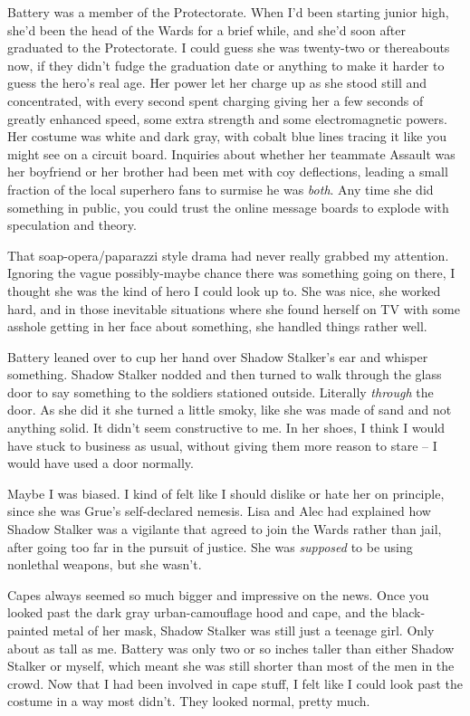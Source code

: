 Battery was a member of the Protectorate.  When I'd been starting junior high, she'd been the head of the Wards for a brief while, and she'd soon after graduated to the Protectorate.  I could guess she was twenty-two or thereabouts now, if they didn't fudge the graduation date or anything to make it harder to guess the hero's real age.  Her power let her charge up as she stood still and concentrated, with every second spent charging giving her a few seconds of greatly enhanced speed, some extra strength and some electromagnetic powers.  Her costume was white and dark gray, with cobalt blue lines tracing it like you might see on a circuit board.  Inquiries about whether her teammate Assault was her boyfriend or her brother had been met with coy deflections, leading a small fraction of the local superhero fans to surmise he was \emph{both}.  Any time she did something in public, you could trust the online message boards to explode with speculation and theory.



That soap-opera/paparazzi style drama had never really grabbed my attention.  Ignoring the vague possibly-maybe chance there was something going on there, I thought she was the kind of hero I could look up to.  She was nice, she worked hard, and in those inevitable situations where she found herself on TV with some asshole getting in her face about something, she handled things rather well.



Battery leaned over to cup her hand over Shadow Stalker's ear and whisper something.  Shadow Stalker nodded and then turned to walk through the glass door to say something to the soldiers stationed outside.  Literally \emph{through} the door.  As she did it she turned a little smoky, like she was made of sand and not anything solid.  It didn't seem constructive to me.  In her shoes, I think I would have stuck to business as usual, without giving them more reason to stare – I would have used a door normally.



Maybe I was biased.  I kind of felt like I should dislike or hate her on principle, since she was Grue's self-declared nemesis.  Lisa and Alec had explained how Shadow Stalker was a vigilante that agreed to join the Wards rather than jail, after going too far in the pursuit of justice.  She was \emph{supposed} to be using nonlethal weapons, but she wasn't.



Capes always seemed so much bigger and impressive on the news.  Once you looked past the dark gray urban-camouflage hood and cape, and the black-painted metal of her mask, Shadow Stalker was still just a teenage girl.  Only about as tall as me.  Battery was only two or so inches taller than either Shadow Stalker or myself, which meant she was still shorter than most of the men in the crowd.  Now that I had been involved in cape stuff, I felt like I could look past the costume in a way most didn't.  They looked normal, pretty much.



